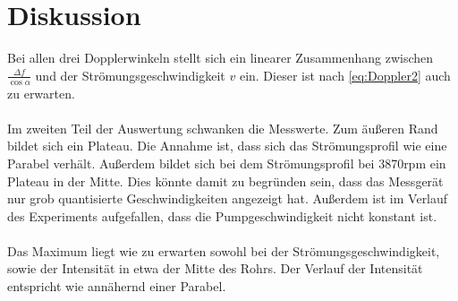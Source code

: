 \section{Diskussion}
\label{sec:Diskussion}

Bei allen drei Dopplerwinkeln stellt sich ein linearer Zusammenhang zwischen $\frac{Δf}{\cos{α}}$ und
der Strömungsgeschwindigkeit $v$ ein. Dieser ist nach \autoref{eq:Doppler2} auch zu erwarten.\\
\\
Im zweiten Teil der Auswertung schwanken die Messwerte.
Zum äußeren Rand bildet sich ein Plateau. Die Annahme ist, dass sich das Strömungsprofil wie eine Parabel verhält.
Außerdem bildet sich bei dem Strömungsprofil bei 3870rpm ein Plateau in der Mitte. 
Dies könnte damit zu begründen sein, dass das Messgerät nur grob quantisierte Geschwindigkeiten angezeigt hat.
Außerdem ist im Verlauf des Experiments aufgefallen, dass die Pumpgeschwindigkeit nicht konstant ist.\\
\\
Das Maximum liegt wie zu erwarten sowohl bei der Strömungsgeschwindigkeit, sowie der Intensität in etwa der Mitte des Rohrs.
Der Verlauf der Intensität entspricht wie annähernd einer Parabel.